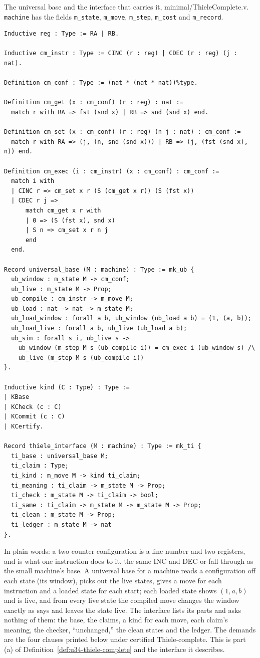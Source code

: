 {\raggedright The universal base and the interface that carries it, minimal/ThieleComplete.v.
\texttt{machine} has the fields \texttt{m\_state}, \texttt{m\_move}, \texttt{m\_step},
\texttt{m\_cost} and \texttt{m\_record}.\par}

{\scriptsize
\begin{verbatim}
Inductive reg : Type := RA | RB.

Inductive cm_instr : Type := CINC (r : reg) | CDEC (r : reg) (j : nat).

Definition cm_conf : Type := (nat * (nat * nat))%type.

Definition cm_get (x : cm_conf) (r : reg) : nat :=
  match r with RA => fst (snd x) | RB => snd (snd x) end.

Definition cm_set (x : cm_conf) (r : reg) (n j : nat) : cm_conf :=
  match r with RA => (j, (n, snd (snd x))) | RB => (j, (fst (snd x), n)) end.

Definition cm_exec (i : cm_instr) (x : cm_conf) : cm_conf :=
  match i with
  | CINC r => cm_set x r (S (cm_get x r)) (S (fst x))
  | CDEC r j =>
      match cm_get x r with
      | 0 => (S (fst x), snd x)
      | S n => cm_set x r n j
      end
  end.

Record universal_base (M : machine) : Type := mk_ub {
  ub_window : m_state M -> cm_conf;
  ub_live : m_state M -> Prop;
  ub_compile : cm_instr -> m_move M;
  ub_load : nat -> nat -> m_state M;
  ub_load_window : forall a b, ub_window (ub_load a b) = (1, (a, b));
  ub_load_live : forall a b, ub_live (ub_load a b);
  ub_sim : forall s i, ub_live s ->
    ub_window (m_step M s (ub_compile i)) = cm_exec i (ub_window s) /\
    ub_live (m_step M s (ub_compile i))
}.

Inductive kind (C : Type) : Type :=
| KBase
| KCheck (c : C)
| KCommit (c : C)
| KCertify.

Record thiele_interface (M : machine) : Type := mk_ti {
  ti_base : universal_base M;
  ti_claim : Type;
  ti_kind : m_move M -> kind ti_claim;
  ti_meaning : ti_claim -> m_state M -> Prop;
  ti_check : m_state M -> ti_claim -> bool;
  ti_same : ti_claim -> m_state M -> m_state M -> Prop;
  ti_clean : m_state M -> Prop;
  ti_ledger : m_state M -> nat
}.
\end{verbatim}}

In plain words: a two-counter configuration is a line number and two registers, and
\code{cm\_exec} is what one instruction does to it, the same INC and DEC-or-fall-through as the
small machine's base. A universal base for a machine reads a configuration off each state (its
window), picks out the live states, gives a move for each instruction and a loaded state for each
start; each loaded state shows $(1, a, b)$ and is live, and from every live state the compiled move
changes the window exactly as \code{cm\_exec} says and leaves the state live. The interface lists
its parts and asks nothing of them: the base, the claims, a kind for each move, each claim's
meaning, the checker, ``unchanged,'' the clean states and the ledger. The demands are the four
clauses printed below under certified Thiele-complete. This is part
(a) of Definition~\ref{def:u34-thiele-complete} and the interface it describes.

